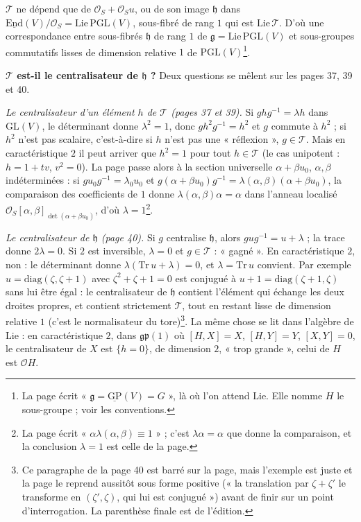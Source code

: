 \documentclass[11pt,a4paper]{article}
\begin{document}
$\mathcal{T}$ ne dépend que de $\mathcal{O}_S + \mathcal{O}_S u$, ou de son image
$\mathfrak{h}$ dans $\underline{\mathrm{End}}(V)/\mathcal{O}_S = \mathrm{Lie}\,\mathrm{PGL}(V)$,
sous-fibré de rang $1$ qui est $\mathrm{Lie}\,\mathcal{T}$. D'où une correspondance
entre sous-fibrés $\mathfrak{h}$ de rang $1$ de $\mathfrak{g} = \mathrm{Lie}\,\mathrm{PGL}(V)$
et sous-groupes commutatifs lisses de dimension relative $1$ de
$\mathrm{PGL}(V)$\footnote{La page écrit « $\mathfrak{g} = \underline{\mathrm{GP}}(V) = G$ »,
là où l'on attend $\mathrm{Lie}$. Elle nomme $H$ le sous-groupe ; voir les
conventions.}.

\textbf{$\mathcal{T}$ est-il le centralisateur de $\mathfrak{h}$ ?} Deux questions se
mêlent sur les pages 37, 39 et 40.

\emph{Le centralisateur d'un élément $h$ de $\mathcal{T}$ (pages 37 et 39).} Si
$g h g^{-1} = \lambda h$ dans $\mathrm{GL}(V)$, le déterminant donne $\lambda^2 = 1$,
donc $g h^2 g^{-1} = h^2$ et $g$ commute à $h^2$ ; si $h^2$ n'est pas scalaire,
c'est-à-dire si $h$ n'est pas une « réflexion », $g \in \mathcal{T}$. Mais en
caractéristique $2$ il peut arriver que $h^2 = 1$ pour tout $h \in \mathcal{T}$ (le cas
unipotent : $h = 1 + tv$, $v^2 = 0$). La page passe alors à la section
universelle $\alpha + \beta u_0$, $\alpha, \beta$ indéterminées : si
$g u_0 g^{-1} = \lambda_0 u_0$ et $g(\alpha + \beta u_0)g^{-1} = \lambda(\alpha,
\beta)(\alpha + \beta u_0)$, la comparaison des coefficients de $1$ donne
$\lambda(\alpha, \beta)\alpha = \alpha$ dans l'anneau localisé
$\mathcal{O}_S[\alpha, \beta]_{\det(\alpha + \beta u_0)}$, d'où
$\lambda = 1$\footnote{La page écrit « $\alpha\lambda(\alpha, \beta) \equiv 1$ » ;
c'est $\lambda\alpha = \alpha$ que donne la comparaison, et la conclusion $\lambda = 1$
est celle de la page.}.

\emph{Le centralisateur de $\mathfrak{h}$ (page 40).} Si $g$ centralise $\mathfrak{h}$,
alors $gug^{-1} = u + \lambda$ ; la trace donne $2\lambda = 0$. Si $2$ est inversible,
$\lambda = 0$ et $g \in \mathcal{T}$ : « gagné ». En caractéristique $2$, non : le
déterminant donne $\lambda(\mathrm{Tr}\,u + \lambda) = 0$, et $\lambda = \mathrm{Tr}\,u$
convient. Par exemple $u = \mathrm{diag}(\zeta, \zeta + 1)$ avec
$\zeta^2 + \zeta + 1 = 0$ est conjugué à $u + 1 = \mathrm{diag}(\zeta + 1, \zeta)$ sans
lui être égal : le centralisateur de $\mathfrak{h}$ contient l'élément qui échange
les deux droites propres, et contient strictement $\mathcal{T}$, tout en restant
lisse de dimension relative $1$ (c'est le normalisateur du tore)\footnote{Ce
paragraphe de la page 40 est barré sur la page, mais l'exemple est juste et la
page le reprend aussitôt sous forme positive (« la translation par
$\zeta + \zeta'$ le transforme en $(\zeta', \zeta)$, qui lui est conjugué ») avant de
finir sur un point d'interrogation. La parenthèse finale est de l'édition.}.
La même chose se lit dans l'algèbre de Lie : en caractéristique $2$, dans
$\mathfrak{gp}(1)$ où $[H, X] = X$, $[H, Y] = Y$, $[X, Y] = 0$, le centralisateur de
$X$ est $\{h = 0\}$, de dimension $2$, « trop grande », celui de $H$ est
$\mathcal{O}H$.
\end{document}
